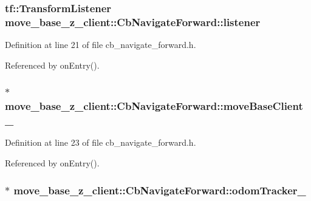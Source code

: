 \subsubsection[{\texorpdfstring{listener}{listener}}]{\setlength{\rightskip}{0pt plus 5cm}tf\+::\+Transform\+Listener move\+\_\+base\+\_\+z\+\_\+client\+::\+Cb\+Navigate\+Forward\+::listener}\hypertarget{classmove__base__z__client_1_1CbNavigateForward_afa40fd805d66eb09e9b4b1bd8356b2a5}{}\label{classmove__base__z__client_1_1CbNavigateForward_afa40fd805d66eb09e9b4b1bd8356b2a5}


Definition at line 21 of file cb\+\_\+navigate\+\_\+forward.\+h.



Referenced by on\+Entry().

\subsubsection[{\texorpdfstring{move\+Base\+Client\+\_\+}{moveBaseClient_}}]{$\ast$ move\+\_\+base\+\_\+z\+\_\+client\+::\+Cb\+Navigate\+Forward\+::move\+Base\+Client\+\_\+}\hypertarget{classmove__base__z__client_1_1CbNavigateForward_ab3b4592cd7f30b490a0549f2ee67c389}{}\label{classmove__base__z__client_1_1CbNavigateForward_ab3b4592cd7f30b490a0549f2ee67c389}


Definition at line 23 of file cb\+\_\+navigate\+\_\+forward.\+h.



Referenced by on\+Entry().

\subsubsection[{\texorpdfstring{odom\+Tracker\+\_\+}{odomTracker_}}]{$\ast$ move\+\_\+base\+\_\+z\+\_\+client\+::\+Cb\+Navigate\+Forward\+::odom\+Tracker\+\_\+}\hypertarget{classmove__base__z__client_1_1CbNavigateForward_a1472ca04aac37644667e8833668a5bab}{}\label{classmove__base__z__client_1_1CbNavigateForward_a1472ca04aac37644667e8833668a5bab}


